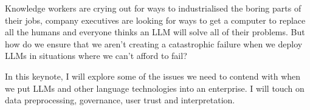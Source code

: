 Knowledge workers are crying out for ways to industrialised the boring parts of their jobs, company executives are looking for ways to get a computer to replace all the humans and everyone thinks an LLM will solve all of their problems. But how do we ensure that we aren’t creating a catastrophic failure when we deploy LLMs in situations where we can’t afford to fail?

In this keynote, I will explore some of the issues we need to contend with when we put LLMs and other language technologies into an enterprise. I will touch on data preprocessing, governance, user trust and interpretation.